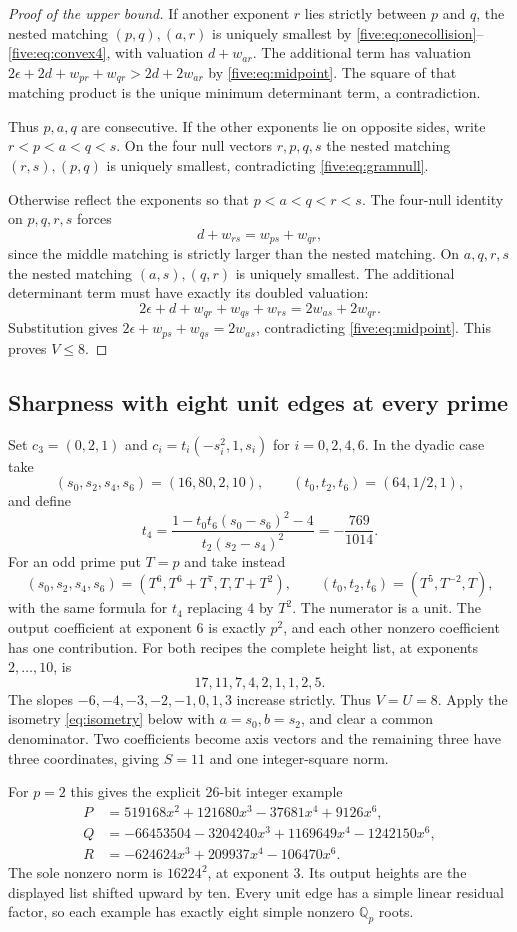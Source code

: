 \documentclass[11pt]{article}
\theoremstyle{remark}\newtheorem{remark}[theorem]{Remark}
\newcommand{\Q}{\mathbb Q}
\begin{document}
\begin{proof}[Proof of the upper bound]
If another exponent $r$ lies strictly between $p$ and $q$, the nested
matching $(p,q),(a,r)$ is uniquely smallest by
\eqref{five:eq:onecollision}--\eqref{five:eq:convex4}, with valuation $d+w_{ar}$.
The additional term has valuation
$2\epsilon+2d+w_{pr}+w_{qr}>2d+2w_{ar}$ by \eqref{five:eq:midpoint}.
The square of that matching product is the unique minimum determinant
term, a contradiction.

Thus $p,a,q$ are consecutive. If the other exponents lie on opposite
sides, write $r<p<a<q<s$. On the four null vectors $r,p,q,s$ the nested
matching $(r,s),(p,q)$ is uniquely smallest, contradicting
\eqref{five:eq:gramnull}.

Otherwise reflect the exponents so that $p<a<q<r<s$.
The four-null identity on $p,q,r,s$ forces
\[
 d+w_{rs}=w_{ps}+w_{qr},
\]
since the middle matching is strictly larger than the nested matching.
On $a,q,r,s$ the nested matching $(a,s),(q,r)$ is uniquely smallest.
The additional determinant term must have exactly its doubled valuation:
\[
 2\epsilon+d+w_{qr}+w_{qs}+w_{rs}=2w_{as}+2w_{qr}.
\]
Substitution gives $2\epsilon+w_{ps}+w_{qs}=2w_{as}$, contradicting
\eqref{five:eq:midpoint}. This proves $V\leq8$.
\end{proof}

\subsection{Sharpness with eight unit edges at every prime}

Set $c_3=(0,2,1)$ and $c_i=t_i(-s_i^2,1,s_i)$ for $i=0,2,4,6$.
In the dyadic case take
\[
 (s_0,s_2,s_4,s_6)=(16,80,2,10),\qquad
 (t_0,t_2,t_6)=(64,1/2,1),
\]
and define
\[
 t_4=\frac{1-t_0t_6(s_0-s_6)^2-4}{t_2(s_2-s_4)^2}
     =-\frac{769}{1014}.
\]
For an odd prime put $T=p$ and take instead
\[
 (s_0,s_2,s_4,s_6)=(T^6,T^6+T^7,T,T+T^2),\qquad
 (t_0,t_2,t_6)=(T^5,T^{-2},T),
\]
with the same formula for $t_4$ replacing $4$ by $T^2$.
The numerator is a unit. The output coefficient at exponent $6$
is exactly $p^2$, and each other nonzero coefficient has one contribution.
For both recipes the complete height list, at exponents $2,\ldots,10$, is
\[
 17,11,7,4,2,1,1,2,5.
\]
The slopes $-6,-4,-3,-2,-1,0,1,3$ increase strictly.
Thus $V=U=8$. Apply the isometry \eqref{eq:isometry} below with
$a=s_0,b=s_2$, and clear a common denominator.
Two coefficients become axis vectors and the remaining three have
three coordinates, giving $S=11$ and one integer-square norm.

For $p=2$ this gives the explicit 26-bit integer example
\begin{align*}
 P&=519168x^2+121680x^3-37681x^4+9126x^6,\\
 Q&=-66453504-3204240x^3+1169649x^4-1242150x^6,\\
 R&=-624624x^3+209937x^4-106470x^6.
\end{align*}
The sole nonzero norm is $16224^2$, at exponent $3$.
Its output heights are the displayed list shifted upward by ten.
Every unit edge has a simple linear residual factor, so each example
has exactly eight simple nonzero $\Q_p$ roots.
\end{document}
